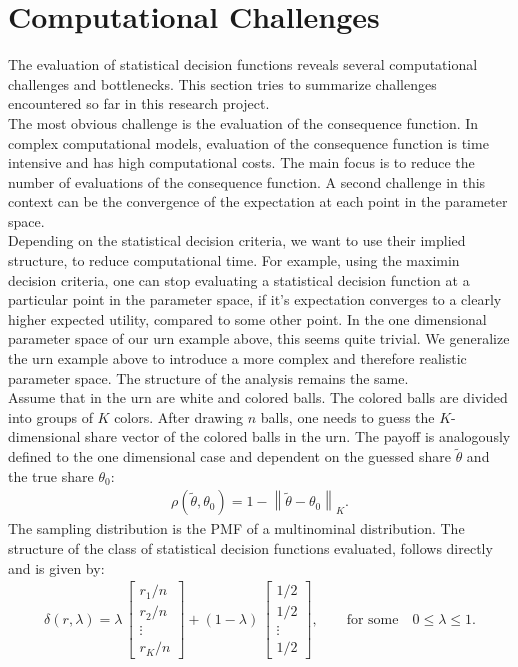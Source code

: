 \section{Computational Challenges}
The evaluation of statistical decision functions reveals several computational challenges and bottlenecks. This section tries to summarize challenges encountered so far in this research project.\\

The most obvious challenge is the evaluation of the consequence function. In complex computational models, evaluation of the consequence function is time intensive and has high computational costs. The main focus is to reduce the number of evaluations of the consequence function. A second challenge in this context can be the convergence of the expectation at each point in the parameter space.\\

Depending on the statistical decision criteria, we want to use their implied structure, to reduce computational time. For example, using the maximin decision criteria, one can stop evaluating a statistical decision function at a particular point in the parameter space, if it's expectation converges to a clearly higher expected utility, compared to some other point. In the one dimensional parameter space of our urn example above, this seems quite trivial. We generalize the urn example above to introduce a more complex and therefore realistic parameter space. The structure of the analysis remains the same.\\

Assume that in the urn are white and colored balls. The colored balls are divided into groups of $K$ colors. After drawing $n$ balls, one needs to guess the $K$-dimensional share vector of the colored balls in the urn. The payoff is analogously defined to the one dimensional case and dependent on the guessed share $\tilde{\theta}$ and the true share $\theta_0$:
\begin{align*}
\rho(\tilde{\theta}, \theta_0) = 1 - \left\|\tilde{\theta} - \theta_0\right\|_K.
\end{align*}
The sampling distribution is the PMF of a multinominal distribution. The structure of the class of statistical decision functions evaluated, follows directly and is given by:
\begin{align*}
 \delta(r, \lambda) = \lambda\,\begin{bmatrix}
           r_{1}/n \\
           r_{2}/n \\
           \vdots \\
           r_{K}/n
         \end{bmatrix}  + (1 - \lambda)\,\begin{bmatrix}
                   1/2 \\
                   1/2 \\
                   \vdots \\
                   1/2
                 \end{bmatrix},\qquad\text{for some}\quad 0 \leq \lambda \leq 1.
\end{align*}
